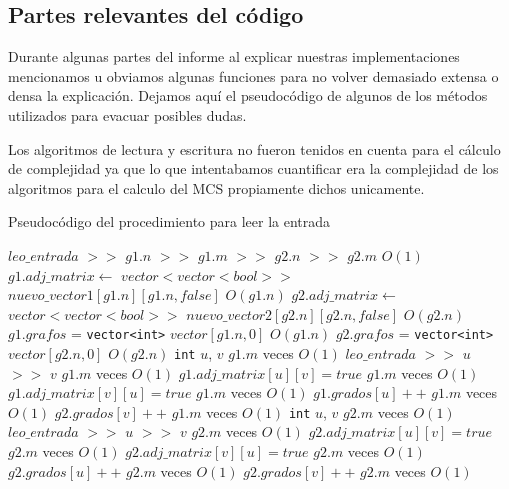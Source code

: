 \newpage
\subsection{Partes relevantes del código}
\lstset{language=C++, breaklines=true, basicstyle=\footnotesize}
\lstset{numbers=left, numberstyle=\tiny, stepnumber=1, numbersep=5pt, tabsize=2}

Durante algunas partes del informe al explicar nuestras implementaciones mencionamos u obviamos algunas funciones para no volver demasiado extensa o densa la explicación. Dejamos aquí el pseudocódigo de algunos de los métodos utilizados para evacuar posibles dudas.

Los algoritmos de lectura y escritura no fueron tenidos en cuenta para el cálculo de complejidad ya que lo que intentabamos cuantificar era la complejidad de los algoritmos para el calculo del MCS propiamente dichos unicamente.

\begin{algorithm}[H]
  \begin{algorithmic}[1]
  \caption{Pseudocódigo del procedimiento para leer la entrada}
  \label{algo:ap-2}
    \State $leo\_entrada$ $>>$ $g1.n$ $>>$ $g1.m$ $>>$ $g2.n$ $>>$ $g2.m$
    \Comment $O(1)$
    	\State $g1.adj\_matrix \gets$ \texttt{$vector<vector<bool>>$} $nuevo\_vector1[g1.n][g1.n,false]$
    \Comment $O(g1.n)$
    	\State $g2.adj\_matrix \gets$ \texttt{$vector<vector<bool>>$} $nuevo\_vector2[g2.n][g2.n,false]$
    \Comment $O(g2.n)$
    \State $g1.grafos$ = \texttt{vector<int>} $vector[g1.n,0]$
    \Comment $O(g1.n)$
    \State $g2.grafos$ = \texttt{vector<int>} $vector[g2.n,0]$
    \Comment $O(g2.n)$
         \State \texttt{int} $u$, $v$
		 \Comment $g1.m$ veces $O(1)$ 
         \State $leo\_entrada$ $>>$ $u$ $>>$ $v$
		 \Comment $g1.m$ veces $O(1)$ 
		 \State $g1.adj\_matrix[u][v] = true$
		 \Comment $g1.m$ veces $O(1)$ 		 
		 \State $g1.adj\_matrix[v][u] = true$
		 \Comment $g1.m$ veces $O(1)$ 
		 \State $g1.grados[u]++$
		 \Comment $g1.m$ veces $O(1)$ 
		 \State $g2.grados[v]++$
		 \Comment $g1.m$ veces $O(1)$ 
    \EndFor
         \State \texttt{int} $u$, $v$
		 \Comment $g2.m$ veces $O(1)$ 
         \State $leo\_entrada$ $>>$ $u$ $>>$ $v$
		 \Comment $g2.m$ veces $O(1)$ 
		 \State $g2.adj\_matrix[u][v] = true$
		 \Comment $g2.m$ veces $O(1)$ 
		 \State $g2.adj\_matrix[v][u] = true$
		 \Comment $g2.m$ veces $O(1)$ 
		 \State $g2.grados[u]++$
		 \Comment $g2.m$ veces $O(1)$ 
		 \State $g2.grados[v]++$
		 \Comment $g2.m$ veces $O(1)$ 
    \EndFor
		\EndProcedure
	\end{algorithmic}
\end{algorithm}


